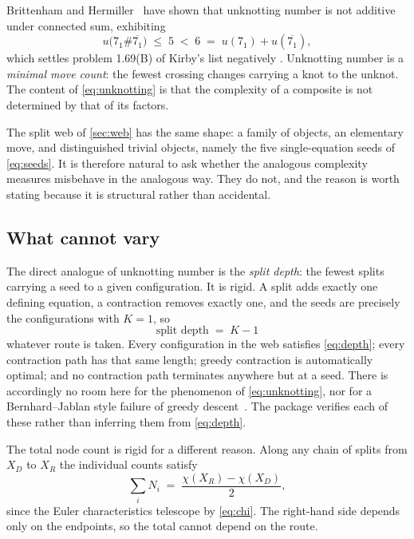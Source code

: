\documentclass[11pt,a4paper]{article}
\newcommand{\XD}{X_D}
\newcommand{\XR}{X_R}
\theoremstyle{definition}
\begin{document}
Brittenham and Hermiller~\cite{Brittenham2025} have shown that unknotting
number is not additive under connected sum, exhibiting
%
\begin{equation}
u\bigl(7_1 \# \overline{7_1}\bigr) \;\le\; 5 \;<\; 6
\;=\; u(7_1) + u(\overline{7_1}),
\label{eq:unknotting}
\end{equation}
%
which settles problem 1.69(B) of Kirby's list negatively \cite{Wang2025}. Unknotting number
is a \emph{minimal move count}: the fewest crossing changes carrying a knot
to the unknot. The content of \cref{eq:unknotting} is that the complexity of
a composite is not determined by that of its factors.

The split web of \cref{sec:web} has the same shape: a family of objects, an
elementary move, and distinguished trivial objects, namely the five
single-equation seeds of \cref{eq:seeds}. It is therefore natural to ask
whether the analogous complexity measures misbehave in the analogous way.
They do not, and the reason is worth stating because it is structural rather
than accidental.

\subsection{What cannot vary}

The direct analogue of unknotting number is the \emph{split depth}: the
fewest splits carrying a seed to a given configuration. It is rigid. A split
adds exactly one defining equation, a contraction removes exactly one, and
the seeds are precisely the configurations with $K=1$, so
%
\begin{equation}
\text{split depth} \;=\; K - 1
\label{eq:depth}
\end{equation}
%
whatever route is taken. Every configuration in the web satisfies
\cref{eq:depth}; every contraction path has that same length; greedy
contraction is automatically optimal; and no contraction path terminates
anywhere but at a seed. There is accordingly no room here for the phenomenon
of \cref{eq:unknotting}, nor for a Bernhard--Jablan style failure of greedy
descent~\cite{Brittenham2021}. The package verifies each of these rather than
inferring them from \cref{eq:depth}.

The total node count is rigid for a different reason. Along any chain of
splits from $\XD$ to $\XR$ the individual counts satisfy
%
\begin{equation}
\sum_i N_i \;=\; \frac{\chi(\XR) - \chi(\XD)}{2},
\label{eq:telescope}
\end{equation}
%
since the Euler characteristics telescope by \cref{eq:chi}. The right-hand
side depends only on the endpoints, so the total cannot depend on the route.
\end{document}
